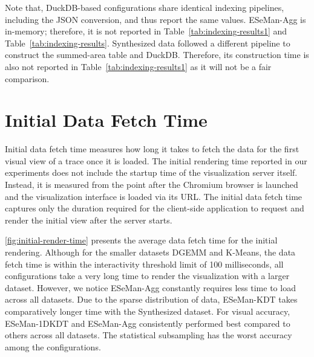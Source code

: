 \begin{refsection}
Note that, DuckDB-based configurations share identical indexing pipelines, including the JSON conversion, and thus report the same values. ESeMan-Agg is in-memory; therefore, it is not reported in Table~\ref{tab:indexing-results1} and Table~\ref{tab:indexing-results}. Synthesized data followed a different pipeline to construct the summed-area table and DuckDB. Therefore, its construction time is also not reported in Table~\ref{tab:indexing-results1} as it will not be a fair comparison.

\section{Initial Data Fetch Time}

Initial data fetch time measures how long it takes to fetch the data for the first visual view of a trace once it is loaded. The initial rendering time reported in our experiments does not include the startup time of the visualization server itself. Instead, it is measured from the point after the Chromium browser is launched and the visualization interface is loaded via its URL. The initial data fetch time captures only the duration required for the client-side application to request and render the initial view after the server starts.

\autoref{fig:initial-render-time} presents the average data fetch time for the initial rendering. Although for the smaller datasets DGEMM and K-Means, the data fetch time is within the interactivity threshold limit of 100 milliseconds, all configurations take a very long time to render the visualization with a larger dataset. However, we notice ESeMan-Agg constantly requires less time to load across all datasets. Due to the sparse distribution of data, ESeMan-KDT takes comparatively longer time with the Synthesized dataset. For visual accuracy, ESeMan-1DKDT and ESeMan-Agg consistently performed best compared to others across all datasets. The statistical subsampling has the worst accuracy among the configurations.



\end{refsection}
